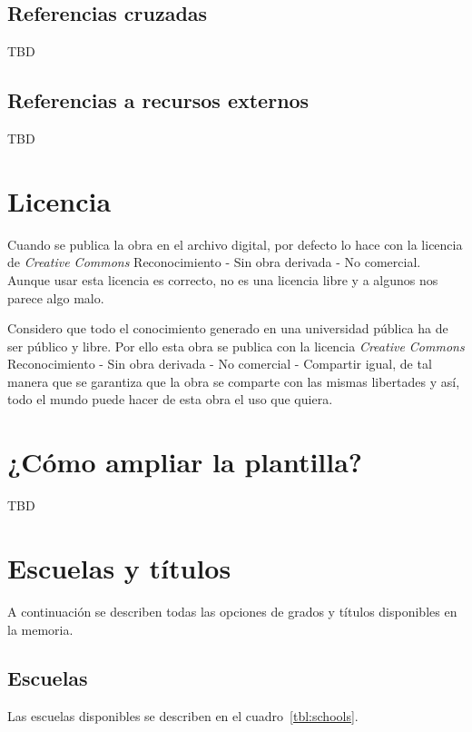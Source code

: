 \documentclass[%
    school=etsisi,%
    type=pfg,%
    degree=61CD,%
]{upm-report}
\begin{document}
\section{Referencias cruzadas}

TBD

\section{Referencias a recursos externos}

TBD

\chapter{Licencia}
\label{ch:licencia}

Cuando se publica la obra en el archivo digital, por defecto lo hace con la licencia de \textit{Creative Commons} Reconocimiento - Sin obra derivada - No comercial. Aunque usar esta licencia es correcto, no es una licencia libre y a algunos nos parece algo malo.

Considero que todo el conocimiento generado en una universidad pública ha de ser público y libre. Por ello esta obra se publica con la licencia \textit{Creative Commons} Reconocimiento - Sin obra derivada - No comercial - Compartir igual, de tal manera que se garantiza que la obra se comparte con las mismas libertades y así, todo el mundo puede hacer de esta obra el uso que quiera.

\appendix

\chapter{¿Cómo ampliar la plantilla?}
\label{ch:ampliar}

TBD

\chapter{Escuelas y títulos}
\label{ch:escuelas-y-titulos}

A continuación se describen todas las opciones de grados y títulos disponibles en la memoria.

\section{Escuelas}

Las escuelas disponibles se describen en el cuadro~\ref{tbl:schools}.
\end{document}
